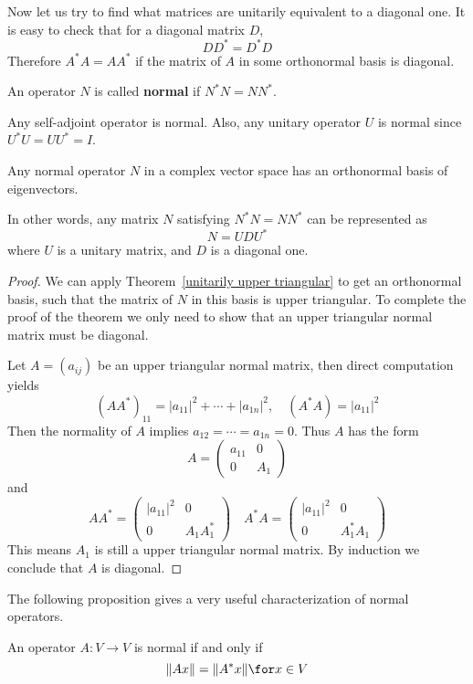 Now let us try to find what matrices are unitarily equivalent to a diagonal one. It is easy to check that for a diagonal matrix $D$,
\[DD^*=D^*D\]
Therefore $A^*A=AA^*$ if the matrix of $A$ in some orthonormal basis is diagonal.
\begin{definition}
An operator $N$ is called \textbf{normal} if $N^*N=NN^*$.
\end{definition}
Any self-adjoint operator is normal. Also, any unitary operator $U$ is normal since $U^*U=UU^*=I$.
\begin{theorem}
Any normal operator $N$ in a complex vector space has an orthonormal basis of eigenvectors.\par
In other words, any matrix $N$ satisfying $N^*N=NN^*$ can be represented as
\[N=UDU^*\]
where $U$ is a unitary matrix, and $D$ is a diagonal one.
\end{theorem}
\begin{proof}
We can apply Theorem~\ref{unitarily upper triangular} to get an orthonormal basis, such that the matrix of $N$ in this basis is upper triangular. To complete the proof of the theorem we only need to show that an upper triangular normal matrix must be diagonal.\par
Let $A=(a_{ij})$ be an upper triangular normal matrix, then direct computation yields
\[(AA^*)_{11}=|a_{11}|^2+\cdots+|a_{1n}|^2,\quad (A^*A)=|a_{11}|^2\]
Then the normality of $A$ implies $a_{12}=\cdots=a_{1n}=0$. Thus $A$ has the form
\[A=\begin{pmatrix}
a_{11}&0\\
0&A_1
\end{pmatrix}\]
and
\[AA^*=\begin{pmatrix}
|a_{11}|^2&0\\
0&A_1A_1^*
\end{pmatrix}\quad A^*A=\begin{pmatrix}
|a_{11}|^2&0\\
0&A_1^*A_1
\end{pmatrix}\]
This means $A_1$ is still a upper triangular normal matrix. By induction we conclude that $A$ is diagonal.
\end{proof}
The following proposition gives a very useful characterization of normal
operators.
\begin{proposition}
An operator $A:V\to V$ is normal if and only if
\[\|Ax\|=\|A^*x\|\for x\in V\]
\end{proposition}
